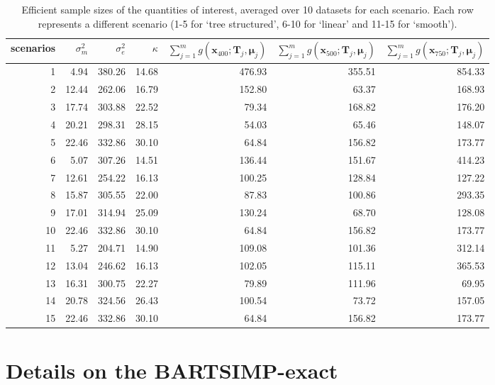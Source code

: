 \documentclass{article}
\begin{document}
\begin{table}[H]
\label{tab:conv}
\centering
\begin{tabular}{rrrrrrr}
  \hline
scenarios & $\sigma_m^2$ & $\sigma_e^2$ & $\kappa$ & $\sum_{j=1}^m g\left(\boldsymbol{x}_{400} ; \mathbf{T}_j, \boldsymbol{\mu}_j\right)$ & $\sum_{j=1}^m g\left(\boldsymbol{x}_{500} ; \mathbf{T}_j, \boldsymbol{\mu}_j\right)$ & $\sum_{j=1}^m g\left(\boldsymbol{x}_{750} ; \mathbf{T}_j, \boldsymbol{\mu}_j\right)$ \\ 
  \hline
1 & 4.94 & 380.26 & 14.68 & 476.93 & 355.51 & 854.33 \\ 
  2 & 12.44 & 262.06 & 16.79 & 152.80 & 63.37 & 168.93 \\ 
  3 & 17.74 & 303.88 & 22.52 & 79.34 & 168.82 & 176.20 \\ 
  4 & 20.21 & 298.31 & 28.15 & 54.03 & 65.46 & 148.07 \\ 
  5 & 22.46 & 332.86 & 30.10 & 64.84 & 156.82 & 173.77 \\ 
  6 & 5.07 & 307.26 & 14.51 & 136.44 & 151.67 & 414.23 \\ 
  7 & 12.61 & 254.22 & 16.13 & 100.25 & 128.84 & 127.22 \\ 
  8 & 15.87 & 305.55 & 22.00 & 87.83 & 100.86 & 293.35 \\ 
  9 & 17.01 & 314.94 & 25.09 & 130.24 & 68.70 & 128.08 \\ 
  10 & 22.46 & 332.86 & 30.10 & 64.84 & 156.82 & 173.77 \\ 
  11 & 5.27 & 204.71 & 14.90 & 109.08 & 101.36 & 312.14 \\ 
  12 & 13.04 & 246.62 & 16.13 & 102.05 & 115.11 & 365.53 \\ 
  13 & 16.31 & 300.75 & 22.27 & 79.89 & 111.96 & 69.95 \\ 
  14 & 20.78 & 324.56 & 26.43 & 100.54 & 73.72 & 157.05 \\ 
  15 & 22.46 & 332.86 & 30.10 & 64.84 & 156.82 & 173.77 \\ 
   \hline
\end{tabular}
\caption{Efficient sample sizes of the quantities of interest, averaged over 10 datasets for each scenario. Each row represents a different scenario (1-5 for `tree structured', 6-10 for `linear' and 11-15 for `smooth').}
\end{table}

\section{Details on the BARTSIMP-exact}
\end{document}
